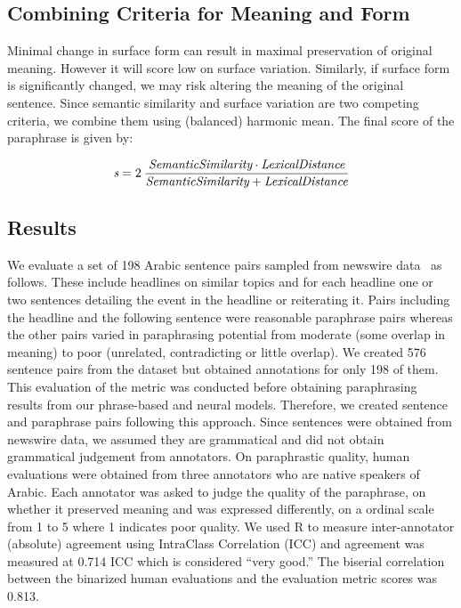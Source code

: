 \documentclass[11pt,letterpaper]{article}
\begin{document}
\subsection{Combining Criteria for Meaning and Form}
Minimal change in surface form can result in maximal preservation of original meaning. However it will score low on surface variation. Similarly, if surface form is significantly changed, we may risk altering the meaning of the original sentence. Since semantic similarity and surface variation are two competing criteria, we combine them using (balanced) harmonic mean. The final score of the paraphrase is given by:

\begin{equation}
\emph{s} = 2\:\frac{\emph{SemanticSimilarity}\cdot\emph{LexicalDistance}}  {\emph{SemanticSimilarity}+\emph{LexicalDistance}}
\end{equation}

\subsection{Results}
\label{evalresult}
We evaluate a set of 198 Arabic sentence pairs sampled from newswire data~\cite{data3} as follows. These include  headlines on similar topics and for each headline one or two sentences detailing the event in the headline or reiterating it. Pairs including the headline and the following sentence were reasonable paraphrase pairs whereas the other pairs varied in paraphrasing potential from moderate (some overlap in meaning) to poor (unrelated, contradicting or little overlap).  We created 576 sentence pairs from the dataset but obtained annotations for only 198 of them. This evaluation of the metric was conducted before obtaining paraphrasing results from our phrase-based and neural models. Therefore, we created sentence and paraphrase pairs following this approach. Since sentences were obtained from newswire data, we assumed they are grammatical and did not obtain grammatical judgement from annotators. On paraphrastic quality, human evaluations were obtained from three annotators who are native speakers of Arabic. Each annotator was asked to judge the quality of the paraphrase, on whether it preserved meaning and was expressed differently, on a ordinal scale from 1 to 5 where 1 indicates poor quality. We used R to measure  inter-annotator (absolute) agreement using IntraClass Correlation (ICC) and agreement was measured at 0.714 ICC which is considered ``very good.'' The biserial correlation between the binarized human evaluations and the evaluation metric scores was 0.813. 
\end{document}
